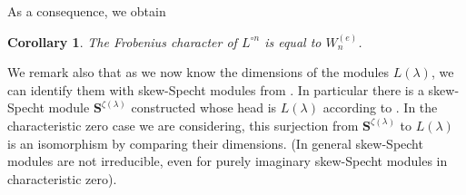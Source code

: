 \documentclass[11pt]{amsart}
\newcommand\la{\lambda}
\newtheorem{cor}[theo]{Corollary}
\theoremstyle{definition}
\numberwithin{equation}{section}
\begin{document}
As a consequence, we obtain 
 
\begin{cor}
The Frobenius character of $L^{\circ n}$ is equal to $W_n^{(e)}$.
\end{cor}




We remark also that as we now know the dimensions of the modules $L(\la)$, we can identify them with skew-Specht modules from \cite{skewspecht}. In particular there is a skew-Specht module ${\mathbf{S}}^{\zeta(\la)}$ constructed whose head is $L(\la)$ according to \cite[Theorem B]{skewspecht}. In the characteristic zero case we are considering, this surjection from ${\mathbf{S}}^{\zeta(\la)}$ to $L(\la)$ is an isomorphism by comparing their dimensions. (In general skew-Specht modules are not irreducible, even for purely imaginary skew-Specht modules in characteristic zero).




\end{document}
